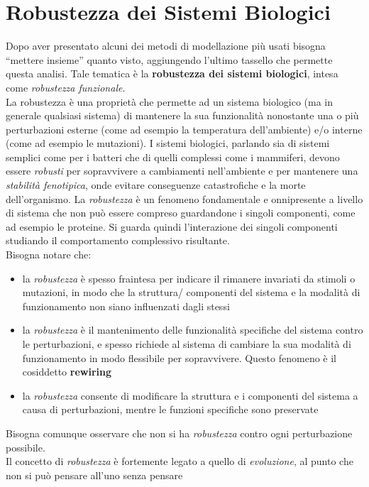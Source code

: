 \documentclass[a4paper,12pt, oneside]{book}
\begin{document}
\chapter{Robustezza dei Sistemi Biologici}
Dopo aver presentato alcuni dei metodi di modellazione più usati bisogna
``mettere insieme'' quanto visto, aggiungendo l'ultimo tassello che permette
questa analisi. Tale tematica è la \textbf{robustezza dei sistemi biologici},
intesa come \textit{robustezza funzionale}.\\
La robustezza è una proprietà che permette ad un sistema biologico (ma in
generale qualsiasi sistema) di
mantenere la sua funzionalità nonostante una o più perturbazioni esterne (come
ad esempio la temperatura dell'ambiente) e/o interne (come ad esempio le
mutazioni). I sistemi biologici, parlando sia di sistemi semplici come per i
batteri che di quelli complessi come i mammiferi, devono essere \textit{robusti}
per sopravvivere 
a cambiamenti nell'ambiente e per mantenere una \textit{stabilità fenotipica},
onde evitare conseguenze catastrofiche e la morte dell'organismo. La
\textit{robustezza} è un fenomeno fondamentale e onnipresente a livello di
sistema che non può essere compreso guardandone i singoli componenti, come ad
esempio le proteine. Si guarda
quindi l'interazione dei singoli componenti studiando il comportamento
complessivo risultante.\\
Bisogna notare che:
\begin{itemize}
  \item la \textit{robustezza} è spesso fraintesa per indicare il rimanere
  invariati da stimoli o mutazioni, in modo che la struttura/
  componenti del sistema e la modalità di funzionamento non siano influenzati
  dagli stessi
  \item la \textit{robustezza} è il mantenimento delle funzionalità specifiche
  del sistema contro le perturbazioni, e spesso richiede al sistema di cambiare
  la sua modalità di funzionamento in modo flessibile per sopravvivere. Questo
  fenomeno è il cosiddetto \textbf{rewiring}
  \item la \textit{robustezza} consente di modificare la struttura e i
  componenti del sistema a causa di perturbazioni, mentre le funzioni specifiche
  sono preservate
\end{itemize}
Bisogna comunque osservare che non si ha \textit{robustezza} contro ogni
perturbazione possibile.\\
Il concetto di \textit{robustezza} è fortemente legato a quello di
\textit{evoluzione}, al punto che non si può pensare all'uno senza pensare
\end{document}
